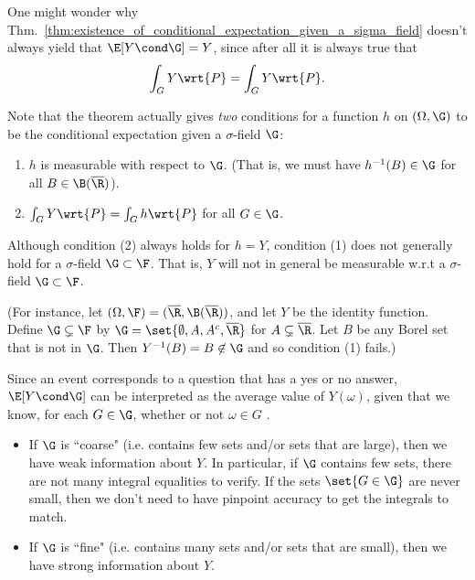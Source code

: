 \documentclass{article} %
\begin{document}
\begin{remark}
One might wonder why Thm.~\ref{thm:existence_of_conditional_expectation_given_a_sigma_field} doesn't always yield that $\E[Y \cond \G] = Y$, since after all it is always true that
\[  \int_G Y \wrt{P} = \int_G Y \wrt{P}.\]

Note that the theorem actually gives \textit{two} conditions for a function $h$ on $(\Omega, \G)$ to be the conditional expectation given a $\sigma$-field $\G$:
\begin{enumerate}
	\item $h$ is measurable with respect to $\G$.  {\scriptsize (That is, we must have $h^{-1}(B) \in \G$ for all $B \in \B(\overline{\R})$).}
	\item $\int_G Y \wrt{P} = \int_G h \wrt{P}$ for all $G \in \G$.
\end{enumerate}

Although condition (2) always holds for $h=Y$, condition (1) does not generally hold for a $\sigma$-field $\G \subset \F$. That is, $Y$ will not in general be measurable w.r.t a $\sigma$-field $\G \subset \F$. 

{\scriptsize (For instance, let $(\Omega, \F) = (\overline{\R}, \B(\overline{\R}))$, and let $Y$ be the identity function.  Define $\G \subsetneq \F$ by $\G = \set{\emptyset, A, A^c, \overline{\R}}$ for $A \subsetneq \overline{\R}$.  Let $B$ be any Borel set that is not in $\G$.  Then $Y^{-1}(B) = B \not\in \G$ and so condition (1) fails.)} 
\label{rk:two_conditions_for_existence_of_conditional_expectation_with_respect_to_a_sigma_field} 
\end{remark}

\begin{remark}
Since an event corresponds to a question that has a yes or no answer, $\E[Y \cond \G]$ can be interpreted as the average value of $Y(\omega)$, given that we know, for each $G \in \G$, whether or not $\omega \in G$ \cite[pp.218]{ash2000probability}.  
\begin{itemize}
\item If $\G$ is ``coarse" (i.e. contains few sets and/or sets that are large), then  we have weak information about $Y$.  In particular, if $\G$ contains few sets, there are not many integral equalities to verify. If the sets $\set{G \in \G}$ are never small, then we don't need to have pinpoint accuracy to get the integrals to match. 

\item If $\G$ is ``fine" (i.e. contains many sets and/or sets that are small), then we have strong information about $Y$.
\end{itemize}
\label{rk:fineness_of_sigma_field_gives_information_about_a_random_variable}
\end{remark}
\end{document}
